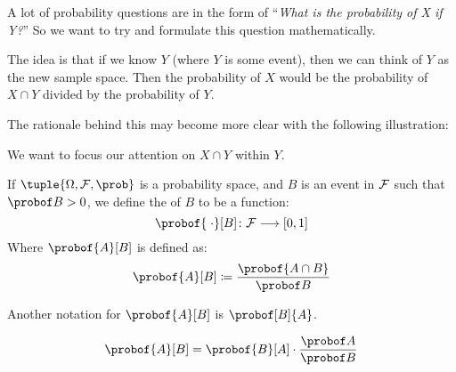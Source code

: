 A lot of probability questions are in the form of ``\textsl{What is the probability of X if Y?}''
So we want to try and formulate this question mathematically.

The idea is that if we know $Y$ (where $Y$ is some event), then we can think of $Y$ as the new sample space.
Then the probability of $X$ would be the probability of $X\cap Y$ divided by the probability of $Y$.

The rationale behind this may become more clear with the following illustration:

\begin{center}
\end{center}

We want to focus our attention on $X\cap Y$ within $Y$.

\begin{defn*}

	If $\tuple{\Omega,\cF,\prob}$ is a probability space, and $B$ is an event in ${\cal F}$ such that $\probof B>0$,
	we define the  of $B$ to be a function:
	\[ \probof{\;\cdot}[B]\colon\cF\longrightarrow[0,1] \]
	Where $\probof{A}[B]$ is defined as:
	\[ \probof{A}[B]\coloneqq\frac{\probof{A\cap B}}{\probof B} \]

	Another notation for $\probof{A}[B]$ is $\probof[B]{A}$.

\end{defn*}

\begin{prop*}

	\[ \probof{A}[B] = \probof{B}[A] \cdot \frac{\probof A}{\probof B} \]

\end{prop*}

